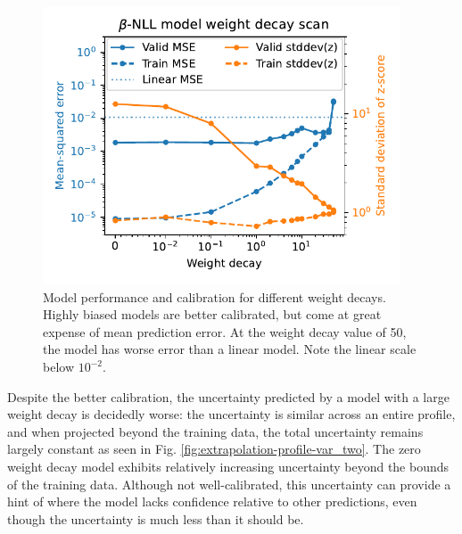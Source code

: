  


\begin{figure}
	\centering
	\includegraphics[width=300pt]{figures/beta-NLL_wd_model_performance.pdf}
	\caption[size=12]{\label{fig:beta-NLL_wd_model_performance}Model performance and calibration for different weight decays. Highly biased models are better calibrated, but come at great expense of mean prediction error. At the weight decay value of 50, the model has worse error than a linear model. Note the linear scale below $10^{-2}$.}
\end{figure}

Despite the better calibration, the uncertainty predicted by a model with a large weight decay is decidedly worse: the uncertainty is similar across an entire profile, and when projected beyond the training data, the total uncertainty remains largely constant as seen in Fig. \ref{fig:extrapolation-profile-var_two}. The zero weight decay model exhibits relatively increasing uncertainty beyond the bounds of the training data. Although not well-calibrated, this uncertainty can provide a hint of where the model lacks confidence relative to other predictions, even though the uncertainty is much less than it should be.


